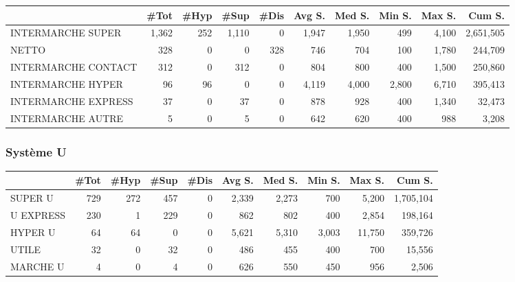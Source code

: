 \documentclass[11pt]{article}
\begin{document}
\begin{table}[H]
\footnotesize
\setlength{\tabcolsep}{2pt}

\begin{tabular}{lrrrrrrrrr}
\toprule
{} &       \#Tot &       \#Hyp &       \#Sup &       \#Dis &     Avg S. &     Med S. &     Min S. &     Max S. &     Cum S. \\
\midrule
INTERMARCHE SUPER   &      1,362 &        252 &      1,110 &          0 &      1,947 &      1,950 &        499 &      4,100 &  2,651,505 \\
NETTO               &        328 &          0 &          0 &        328 &        746 &        704 &        100 &      1,780 &    244,709 \\
INTERMARCHE CONTACT &        312 &          0 &        312 &          0 &        804 &        800 &        400 &      1,500 &    250,860 \\
INTERMARCHE HYPER   &         96 &         96 &          0 &          0 &      4,119 &      4,000 &      2,800 &      6,710 &    395,413 \\
INTERMARCHE EXPRESS &         37 &          0 &         37 &          0 &        878 &        928 &        400 &      1,340 &     32,473 \\
INTERMARCHE AUTRE   &          5 &          0 &          5 &          0 &        642 &        620 &        400 &        988 &      3,208 \\
\bottomrule
\end{tabular}

\end{table}

\subsubsection{Système U}

\begin{table}[H]
\footnotesize
\setlength{\tabcolsep}{2pt}

\begin{tabular}{lrrrrrrrrr}
\toprule
{} &       \#Tot &       \#Hyp &       \#Sup &       \#Dis &     Avg S. &     Med S. &     Min S. &     Max S. &     Cum S. \\
\midrule
SUPER U   &        729 &        272 &        457 &          0 &      2,339 &      2,273 &        700 &      5,200 &  1,705,104 \\
U EXPRESS &        230 &          1 &        229 &          0 &        862 &        802 &        400 &      2,854 &    198,164 \\
HYPER U   &         64 &         64 &          0 &          0 &      5,621 &      5,310 &      3,003 &     11,750 &    359,726 \\
UTILE     &         32 &          0 &         32 &          0 &        486 &        455 &        400 &        700 &     15,556 \\
MARCHE U  &          4 &          0 &          4 &          0 &        626 &        550 &        450 &        956 &      2,506 \\
\bottomrule
\end{tabular}

\end{table}
\end{document}
